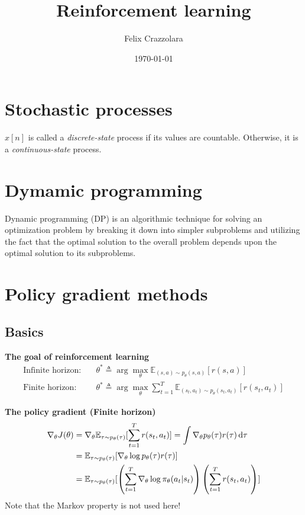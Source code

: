 \documentclass[a4paper, fontsize=8pt, landscape, DIV=1]{scrartcl}
\title{Reinforcement learning}
\author{Felix Crazzolara}
\date{\today}
\begin{document}
\setcounter{secnumdepth}{2} %

\begin{multicols*}{3}

\maketitle 

\section{Stochastic processes\cite{Papoulis1965ProbabilityRV}}
$x[n]$ is called a \textit{discrete-state} process if its values are countable. Otherwise, it is a \textit{continuous-state} process.

\section{Dymamic programming}
Dynamic programming (DP) is an algorithmic technique for solving an optimization problem by breaking it down into simpler subproblems and utilizing the fact that the optimal solution to the overall problem depends upon the optimal solution to its subproblems.

\section{Policy gradient methods}
\subsection{Basics}
\textbf{The goal of reinforcement learning}\\[3pt]
\begin{align*}
\text{Infinite horizon:}&\quad\theta^*\triangleq\arg\max_{\theta}\mathbb{E}_{(s,a)\sim p_{\theta}(s,a)}[r(s,a)] \\[3pt]
\text{Finite horizon:}&\quad\theta^*\triangleq\arg\max_{\theta}\sum\limits_{t=1}^{T}\mathbb{E}_{(s_t,a_t)\sim p_{\theta}(s_t,a_t)}[r(s_t,a_t)]
\end{align*}

\textbf{The policy gradient (Finite horizon)}\\[3pt]
\begin{align*}
\nabla_{\theta}J(\theta)&=\nabla_{\theta}\mathbb{E}_{\tau\sim p_{\theta}(\tau)}[\sum\limits_{t=1}^{T}r(s_t,a_t)]=\int\nabla_{\theta}p_{\theta}(\tau)r(\tau)\dif\tau\\
&=\mathbb{E}_{\tau\sim p_{\theta}(\tau)}[\nabla_{\theta}\log p_{\theta}(\tau)r(\tau)] \\
&=\mathbb{E}_{\tau\sim p_{\theta}(\tau)}[\left(\sum\limits_{t=1}^{T}\nabla_{\theta}\log\pi_{\theta}(a_t|s_t)\right)\left(\sum\limits_{t=1}^{T}r(s_t,a_t)\right)]
\end{align*}
Note that the Markov property is not used here!


\end{multicols*}
\end{document}
